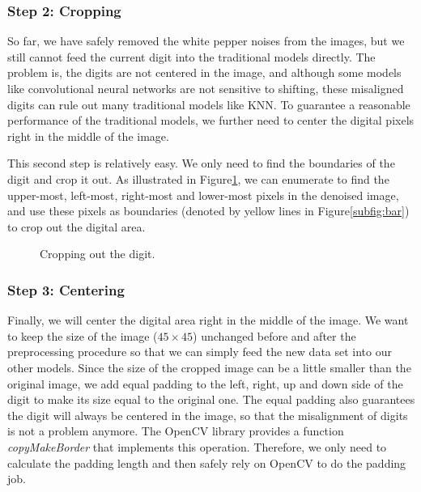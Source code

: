 \documentclass{article}
\begin{document}
\subsubsection{Step 2: Cropping}

So far, we have safely removed the white pepper noises from the images, but we still cannot feed the current digit into the traditional models directly. The problem is, the digits are not centered in the image, and although some models like convolutional neural networks are not sensitive to shifting, these misaligned digits can rule out many traditional models like KNN. To guarantee a reasonable performance of the traditional models, we further need to center the digital pixels right in the middle of the image.

This second step is relatively easy. We only need to find the boundaries of the digit and crop it out. As illustrated in Figure\ref{fig:crop}, we can enumerate to find the upper-most, left-most, right-most and lower-most pixels in the denoised image, and use these pixels as boundaries (denoted by yellow lines in Figure\ref{subfig:bar}) to crop out the digital area.

\begin{figure}[!htb]
	\centering
\hspace{.2in}
	\caption{Cropping out the digit.}
	\label{fig:crop}
\end{figure}

\subsubsection{Step 3: Centering}
Finally, we will center the digital area right in the middle of the image. We want to keep the size of the image ($45\times 45$) unchanged before and after the preprocessing procedure so that we can simply feed the new data set into our other models. Since the size of the cropped image can be a little smaller than the original image, we add equal padding to the left, right, up and down side of the digit to make its size equal to the original one. The equal padding also guarantees the digit will always be centered in the image, so that the misalignment of digits is not a problem anymore. The OpenCV library provides a function \textit{copyMakeBorder} that implements this operation. Therefore, we only need to calculate the padding length and then safely rely on OpenCV to do the padding job. 
\end{document}
